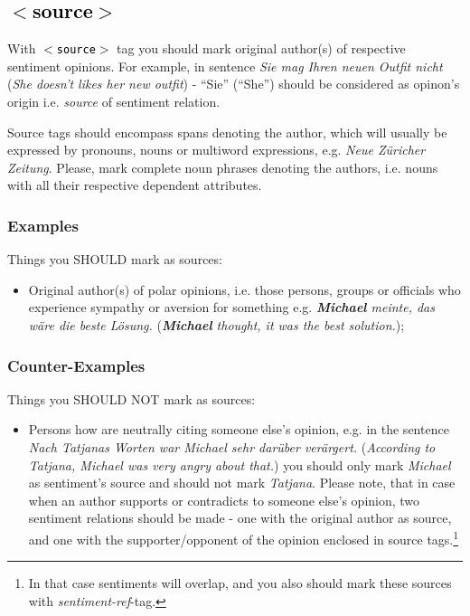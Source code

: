 \documentclass[11pt,a4paper]{article}
\newcommand{\xmltag}[1]{\textcolor{black}{{\small$<$#1$>$}}}
\begin{document}

\subsection{\xmltag{source}}
With \texttt{\xmltag{source}} tag you should mark original author(s)
of respective sentiment opinions. For example, in sentence \textit{Sie
  mag Ihren neuen Outfit nicht} (\textit{She doesn't likes her new
  outfit}) - ``Sie'' (``She'') should be considered as opinon's origin
i.e. \textit{source} of sentiment relation.

Source tags should encompass spans denoting the author, which will
usually be expressed by pronouns, nouns or multiword expressions,
e.g. \textit{Neue Z\"uricher Zeitung}. Please, mark complete noun
phrases denoting the authors, i.e. nouns with all their respective
dependent attributes.

\subsubsection{Examples}
Things you SHOULD mark as sources:
\begin{itemize}
  \item Original author(s) of polar opinions, i.e. those persons,
    groups or officials who experience sympathy or aversion for
    something e.g. \textit{\textbf{Michael} meinte, das w\"are die
      beste L\"osung.}  (\textit{\textbf{Michael} thought, it was the
      best solution.});
\end{itemize}

\subsubsection{Counter-Examples}
Things you SHOULD NOT mark as sources:
\begin{itemize}
  \item Persons how are neutrally citing someone else's opinion,
    e.g. in the sentence \textit{Nach Tatjanas Worten war Michael sehr
      dar\"uber ver\"argert.} (\textit{According to Tatjana, Michael
      was very angry about that.}) you should only mark
    \textit{Michael} as sentiment's source and should not mark
    \textit{Tatjana}. Please note, that in case when an author
    supports or contradicts to someone else's opinion, two sentiment
    relations should be made - one with the original author as source,
    and one with the supporter/opponent of the opinion enclosed in
    source tags.\footnote{In that case sentiments will overlap, and
      you also should mark these sources with \textit{sentiment-ref}-tag.}
\end{itemize}
\end{document}
